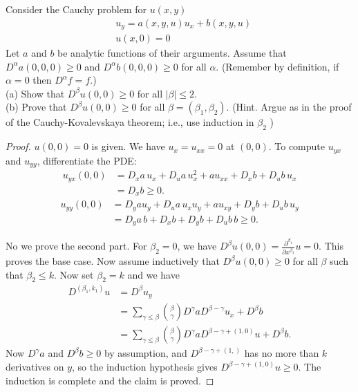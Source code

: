 \begin{problem}
	Consider the Cauchy problem for $u(x, y)$
\[
\begin{aligned}
& u_y=a(x, y, u) u_x+b(x, y, u) \\
& u(x, 0)=0
\end{aligned}
\]
Let $a$ and $b$ be analytic functions of their arguments. Assume that $D^\alpha a(0,0,0) \geq 0$ and $D^\alpha b(0,0,0) \geq 0$ for all $\alpha$. (Remember by definition, if $\alpha=0$ then $D^\alpha f=f$.)\\
(a) Show that $D^\beta u(0,0) \geq 0$ for all $|\beta| \leq 2$.\\
(b) Prove that $D^\beta u(0,0) \geq 0$ for all $\beta=\left(\beta_1, \beta_2\right)$. (Hint. Argue as in the proof of the Cauchy-Kovalevskaya theorem; i.e., use induction in $\beta_2$ )
\end{problem}
\begin{proof}
	$u(0,0) = 0$ is given. We have $u_x = u_{x x} = 0$ at $(0,0)$. To compute $u_{yx }$ and $u_{yy }$, differentiate the PDE:
	\begin{align*}
		u_{yx }(0,0) &= D_x a \, u_x + D_u a \, u_x^2 + a u_{x x} + D_x b + D_u b \, u_x\\
		&= D_x b \ge  0
	.\end{align*}
	\begin{align*}
		u_{yy }(0,0) &= D_y a u_y + D_u a \, u_x u_y + a u_{x y} + D_y b + D_u b \, u_y \\
		&= D_y a \, b + D_x b + D_y b + D_u b \, b 
		\ge 0
	.\end{align*}

	No we prove the second part. For $\beta_2 = 0$, we have $D^\beta u(0,0) = \frac{\partial ^{\beta_1}}{\partial x^{\beta_1}} u = 0$. This proves the base case. Now assume inductively that $D^\beta u(0,0) \ge 0$ for all $\beta$ such that $\beta_2 \le  k$. Now set $\beta_2 = k$ and we have
	\begin{align*}
		D^{(\beta_1, k_1)} u 
		&= D^{\beta} u_y \\
		&= \sum_{\gamma \le \beta} \binom{\beta}{\gamma} D^\gamma a D^{\beta - \gamma} u_x + D^\beta b\\
		&= \sum_{\gamma \le \beta} \binom{\beta}{\gamma} D^\gamma a D^{\beta - \gamma + (1,0)}u + D^\beta b
	.\end{align*}
	Now $D^\gamma a$ and $D^\beta b \ge 0$  by assumption, and $D^{\beta - \gamma + (1,)}$ has no more than $k$ derivatives on $y$, so the induction hypothesis gives  $D^{\beta - \gamma + (1,0)}u\ge 0$. The induction is complete and the claim is proved.
\end{proof}
\newpage

